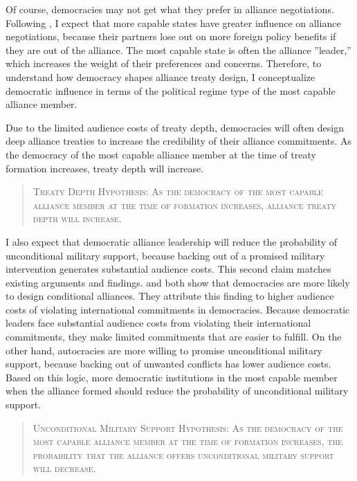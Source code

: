 \documentclass[12pt]{article}
\begin{document}
Of course, democracies may not get what they prefer in alliance negotiations. 
Following \citep{Mattes2012}, I expect that more capable states have greater influence on alliance negotiations, because their partners lose out on more foreign policy benefits if they are out of the alliance.
The most capable state is often the alliance ''leader,'' which increases the weight of their preferences and concerns. 
Therefore, to understand how democracy shapes alliance treaty design, I conceptualize democratic influence in terms of the political regime type of the most capable alliance member. 


Due to the limited audience costs of treaty depth, democracies will often design deep alliance treaties to increase the credibility of their alliance commitments. 
As the democracy of the most capable alliance member at the time of treaty formation increases, treaty depth will increase. 


\begin{quote}
\textsc{Treaty Depth Hypothesis: As the democracy of the most capable alliance member at the time of formation increases, alliance treaty depth will increase.}
\end{quote} 


I also expect that democratic alliance leadership will reduce the probability of unconditional military support, because backing out of a promised military intervention generates substantial audience costs. 
This second claim matches existing arguments and findings. 
\citet{Mattes2012} and \citet{Chibaetal2015} both show that democracies are more likely to design conditional alliances. 
They attribute this finding to higher audience costs of violating international commitments in democracies. 
Because democratic leaders face substantial audience costs from violating their international commitments, they make limited commitments that are easier to fulfill. 
On the other hand, autocracies are more willing to promise unconditional military support, because backing out of unwanted conflicts has lower audience costs. 
Based on this logic, more democratic institutions in the most capable member when the alliance formed should reduce the probability of unconditional military support.


\begin{quote}
\textsc{Unconditional Military Support Hypothesis: As the democracy of the most capable alliance member at the time of formation increases, the probability that the alliance offers unconditional military support will decrease.}
\end{quote} 
\end{document}
